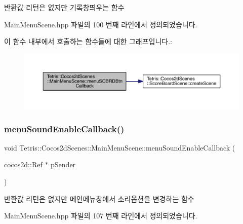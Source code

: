 \begin{DoxyReturn}{반환값}
리턴은 없지만 기록창띄우는 함수 
\end{DoxyReturn}


Main\+Menu\+Scene.\+hpp 파일의 100 번째 라인에서 정의되었습니다.

이 함수 내부에서 호출하는 함수들에 대한 그래프입니다.\+:
\nopagebreak
\begin{figure}[H]
\begin{center}
\leavevmode
\includegraphics[width=350pt]{class_tetris_1_1_cocos2d_scenes_1_1_main_menu_scene_a2fdee3d586584f0186569ccd13d2d7fc_cgraph}
\end{center}
\end{figure}
\mbox{\label{class_tetris_1_1_cocos2d_scenes_1_1_main_menu_scene_a0a6113964573664add11cd1e08ffdd03}} 
\subsubsection{\texorpdfstring{menu\+Sound\+Enable\+Callback()}{menuSoundEnableCallback()}}
{\footnotesize\ttfamily void Tetris\+::\+Cocos2d\+Scenes\+::\+Main\+Menu\+Scene\+::menu\+Sound\+Enable\+Callback (\begin{DoxyParamCaption}\item[{cocos2d\+::\+Ref $\ast$}]{p\+Sender }\end{DoxyParamCaption})\hspace{0.3cm}{\ttfamily [inline]}}

\begin{DoxyReturn}{반환값}
리턴은 없지만 메인메뉴창에서 소리옵션을 변경하는 함수 
\end{DoxyReturn}


Main\+Menu\+Scene.\+hpp 파일의 107 번째 라인에서 정의되었습니다.


